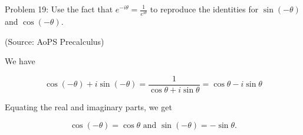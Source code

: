 Problem 19: Use the fact that $e^{-i\theta} = \frac{1}{e^{i\theta}}$ to reproduce the identities for $\sin(-\theta)$ and $\cos(-\theta)$.

(Source: AoPS Precalculus)

We have

$$ \cos(-\theta) + i\sin(-\theta) = \frac{1}{\cos \theta + i \sin \theta} = \cos \theta - i \sin \theta $$

Equating the real and imaginary parts, we get

$$ \boxed{\cos(-\theta) = \cos \theta} \text{ and } \boxed{\sin(-\theta) = -\sin \theta}. $$
